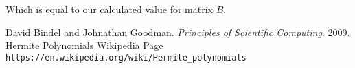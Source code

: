 \documentclass{article}
\begin{document}
		Which is equal to our calculated value for matrix $B$.
		
		
\begin{thebibliography}{2}
	David Bindel and Johnathan Goodman.
	\textit{Principles of Scientific Computing}. 
	2009.
	Hermite Polynomials Wikipedia Page
	\\\texttt{https://en.wikipedia.org/wiki/Hermite\_polynomials}
\end{thebibliography}
\end{document}
